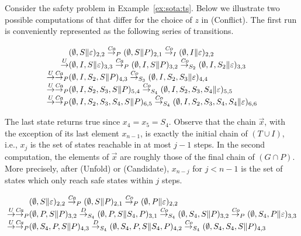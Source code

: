 \begin{example}\label{ex:pdr:simple-ts}
	Consider the safety problem in Example~\ref{ex:sota:ts}. Below we illustrate two possible computations of {\APDR} that differ for the choice of $z$ in (Conflict).
	The first run is conveniently represented as the following series of transitions.
	\par\nobreak
	{
		\setlength{\abovedisplayskip}{0pt}
		\setlength{\belowdisplayskip}{6pt}
		\setlength{\abovedisplayshortskip}{0pt}
		\setlength{\belowdisplayshortskip}{3pt}
		\begin{align*}
			                     & ( \emptyset, S \| \varepsilon )_{2,2}
			\tr{\mathit{Ca}}_{P} ( \emptyset, S \| P )_{2,1}
			\tr{\mathit{Co}}_{I} ( \emptyset, I \| \varepsilon )_{2,2}                  \\[-.4em]
			\tr{U}               & ( \emptyset, I, S \| \varepsilon )_{3,3}
			\tr{\mathit{Ca}}_{P} ( \emptyset, I, S \| P )_{3,2}
			\tr{\mathit{Co}}_{S_2} ( \emptyset, I, S_2 \| \varepsilon )_{3,3}           \\[-.4em]
			\tr{U} %
			\tr{\mathit{Ca}}_{P} & ( \emptyset, I, S_2, S \| P )_{4,3}
			\tr{\mathit{Co}}_{S_3} ( \emptyset, I, S_2, S_3 \| \varepsilon )_{4,4}      \\[-.4em]
			\tr{U} %
			\tr{\mathit{Ca}}_{P} & ( \emptyset, I, S_2, S_3, S \| P )_{5,4}
			\tr{\mathit{Co}}_{S_4} ( \emptyset, I, S_2, S_3, S_4 \| \varepsilon )_{5,5} \\[-.4em]
			\tr{U} %
			\tr{\mathit{Ca}}_{P} & ( \emptyset, I, S_2, S_3, S_4, S \| P )_{6,5}
			\tr{\mathit{Co}}_{S_4} ( \emptyset, I, S_2, S_3, S_4, S_4 \| \varepsilon )_{6,6}
		\end{align*}
	}

	\noindent
	The last state returns true since $x_4 = x_5 = S_4$. Observe that the chain $\vec{x}$, with the exception of its last element $x_{n-1}$, is exactly the initial chain of $(T \cup I)$, i.e., $x_j$ is the set of states reachable in at most $j-1$ steps. In the second computation, the elements of $\vec{x}$ are roughly those of the final chain of $(G \cap P)$. More precisely, after (Unfold) or (Candidate), $x_{n-j}$ for $j < n-1$ is the set of states which only reach safe states within $j$ steps.
	\par\nobreak
	{
		\setlength{\abovedisplayskip}{0pt}
		\setlength{\belowdisplayskip}{6pt}
		\setlength{\abovedisplayshortskip}{0pt}
		\setlength{\belowdisplayshortskip}{3pt}
		\begin{align*}
			                     & ( \emptyset, S \| \varepsilon )_{2,2}
			\tr{\mathit{Ca}}_{P} ( \emptyset, S \| P )_{2,1}
			\tr{\mathit{Co}}_{P} ( \emptyset, P \| \varepsilon )_{2,2}      \\[-.4em]
			\tr{U} %
			\tr{\mathit{Ca}}_{P} & ( \emptyset, P, S \| P )_{3,2}
			\tr{D}_{S_4} ( \emptyset, P, S \| S_4, P )_{3,1}
			\tr{\mathit{Co}}_{S_4} ( \emptyset, S_4, S \| P )_{3,2}
			\tr{\mathit{Co}}_{P} ( \emptyset, S_4, P \| \varepsilon )_{3,3} \\[-.4em]
			\tr{U} %
			\tr{\mathit{Ca}}_{P} & ( \emptyset, S_4, P, S \| P )_{4,3}
			\tr{D}_{S_4} ( \emptyset, S_4, P, S \| S_4, P )_{4,2}
			\tr{\mathit{Co}}_{S_4} ( \emptyset, S_4, S_4, S \| P )_{4,3}
		\end{align*}
	}


\end{example}
